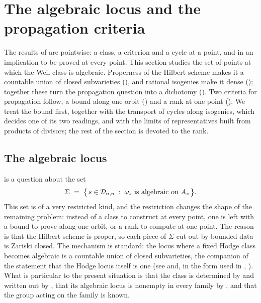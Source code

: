 \section{The algebraic locus and the propagation criteria}\label{sec:propagation}

The results of  are pointwise: a class, a criterion and
a cycle at a point, and in  an implication to be proved
at every point. This section studies the set of points at which the Weil class
is algebraic. Properness of the Hilbert scheme makes it a countable union of
closed subvarieties (), and rational isogenies make it
dense (); together these turn the propagation question
into a dichotomy (). Two criteria for propagation
follow, a bound along one orbit () and a rank at one
point (). We treat the bound first, together with
the transport of cycles along isogenies, which decides one of its two
readings, and with the limits of representatives built from products of
divisors; the rest of the section is devoted to the rank.

\subsection{The algebraic locus}
\label{ssec:properness}

 is a question about the set
\[
  \Sigma \;=\; \bigl\{\,s\in\mathcal{D}_{n,n} \;:\;
    \omega_{s}\ \text{is algebraic on}\ A_{s}\,\bigr\}.
\]
This set is of a very restricted kind, and the restriction changes the shape
of the remaining problem: instead of a class to construct at every point, one
is left with a bound to prove along one orbit, or a rank to compute at one
point. The reason is that the Hilbert scheme is proper, so each piece of
$\Sigma$ cut out by bounded data is Zariski closed. The mechanism is standard:
the locus where a fixed Hodge class becomes algebraic is a countable union of
closed subvarieties, the companion of the statement that the Hodge locus
itself is one (see \cite[Chapter~5]{Voi03} and, in the form used in
, \cite{CDK95}). What is particular to the present situation is
that the class is determined by  and written out by
, that its algebraic locus is nonempty in every family
by , and that the group acting on the family is known.


